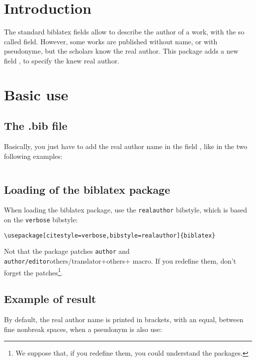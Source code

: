 \documentclass{ltxdockit}[2011/03/25]
\newcommand{\biblatex}{biblatex\xspace}
\newcommand{\namebibstyle}[1]{\texttt{#1}}
\begin{document}
\printtitlepage
\tableofcontents
\section{Introduction}

The standard biblatex fields allow to describe the author of a work, with the so called  field. However, some works are published without name, or with pseudonyme, but the scholars know the real author. This package adds a new field , to specify the knew real author.

\section{Basic use}

\subsection{The .bib file}
Basically, you just have to add the real author name in the field , like in the two following examples: 

\inputminted{tex}{example.bib}

\subsection{Loading of the \biblatex package}

When loading the \biblatex package, use the \namebibstyle{realauthor}  bibstyle, which is based on the \namebibstyle{verbose} bibstyle:

\begin{verbatim}
\usepackage[citestyle=verbose,bibstyle=realauthor]{biblatex}
\end{verbatim}

Not that the package patches \verb+author+ and \verb+author/editor+others/translator+others+ macro. If you redefine them, don't forget the patches\footnote{We suppose that, if you redefine them, you could understand the packages.}.

\subsection{Example of result}

By default, the real author name is printed in brackets, with an equal, between fine nonbreak spaces,  when a pseudonym is also use:
\begin{quotation}
\cite{LeClerc1686}

\cite{Simon1686}
\end{quotation}
\end{document}
